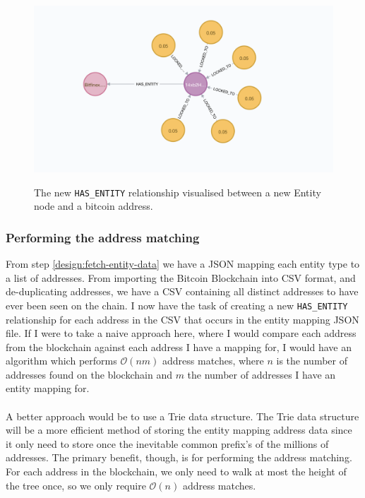 \begin{figure}[h!]
  \centering
  \includegraphics[width = 15cm]{./figures/has-entity-relationship}\\[0.5cm] 
  \caption{The new \texttt{HAS\_ENTITY} relationship visualised between a new Entity node and a bitcoin address.}
  \label{fig:neo4j-has-entity}
\end{figure}

\subsubsection{Performing the address matching} 
From step \ref{design:fetch-entity-data} we have a JSON mapping each entity type to a list of addresses. From importing the Bitcoin Blockchain into CSV format, and de-duplicating addresses, we have a CSV containing all distinct addresses to have ever been seen on the chain. I now have the task of creating a new \texttt{HAS\_ENTITY} relationship for each address in the CSV that occurs in the entity mapping JSON file. If I were to take a naive approach here, where I would compare each address from the blockchain against each address I have a mapping for, I would have an algorithm which performs $\mathcal{O}(nm)$ address matches, where $n$ is the number of addresses found on the blockchain and $m$ the number of addresses I have an entity mapping for. 
\\\\
A better approach would be to use a Trie data structure. The Trie data structure will be a more efficient method of storing the entity mapping address data since it only need to store once the inevitable common prefix's of the millions of addresses. The primary benefit, though, is for performing the address matching. For each address in the blockchain, we only need to walk at most the height of the tree once, so we only require $\mathcal{O}(n)$ address matches. 